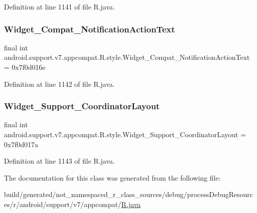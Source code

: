 Definition at line 1141 of file R.\+java.

\mbox{\label{classandroid_1_1support_1_1v7_1_1appcompat_1_1_r_1_1style_a18e9124d71139940e68076f3be26805b}} 
\subsubsection{\texorpdfstring{Widget\_Compat\_NotificationActionText}{Widget\_Compat\_NotificationActionText}}
{\footnotesize\ttfamily final int android.\+support.\+v7.\+appcompat.\+R.\+style.\+Widget\+\_\+\+Compat\+\_\+\+Notification\+Action\+Text = 0x7f0d016e\hspace{0.3cm}{\ttfamily [static]}}



Definition at line 1142 of file R.\+java.

\mbox{\label{classandroid_1_1support_1_1v7_1_1appcompat_1_1_r_1_1style_a423ec154d1ddfd6adbe6d0971ad080e3}} 
\subsubsection{\texorpdfstring{Widget\_Support\_CoordinatorLayout}{Widget\_Support\_CoordinatorLayout}}
{\footnotesize\ttfamily final int android.\+support.\+v7.\+appcompat.\+R.\+style.\+Widget\+\_\+\+Support\+\_\+\+Coordinator\+Layout = 0x7f0d017a\hspace{0.3cm}{\ttfamily [static]}}



Definition at line 1143 of file R.\+java.



The documentation for this class was generated from the following file\+:\begin{DoxyCompactItemize}
\item 
build/generated/not\+\_\+namespaced\+\_\+r\+\_\+class\+\_\+sources/debug/process\+Debug\+Resources/r/android/support/v7/appcompat/\mbox{\hyperlink{android_2support_2v7_2appcompat_2_r_8java}{R.\+java}}\end{DoxyCompactItemize}
